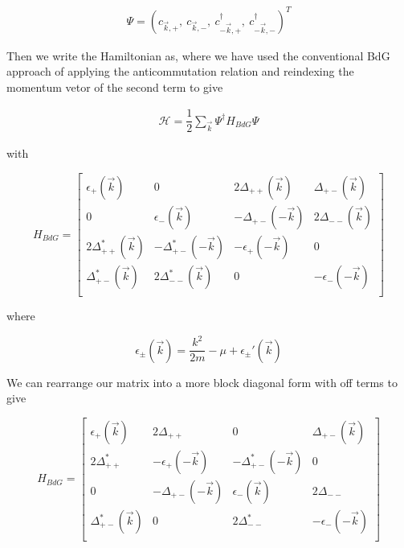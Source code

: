 \begin{align}
  \Psi = (c_{\vec{k},+},\ c_{\vec{k},-},\ c_{-\vec{k},+}^{\dagger},\ c_{-\vec{k},-}^{\dagger} )^T
\end{align}

Then we write the Hamiltonian as, where we have used the conventional BdG approach of applying the anticommutation relation and reindexing the momentum vetor of the second term to give

\begin{align}
  \mathcal{H} = \dfrac{1}{2}\sum\limits_{\vec{k}} \Psi^{\dagger}H_{BdG}\Psi
\end{align}

with 

\begin{equation}
  H_{BdG} = 
  \begin{bmatrix}
    \epsilon_+(\vec{k}) & 0 & 2\Delta_{++}(\vec{k}) & \Delta_{+-}(\vec{k}) \\
    0 & \epsilon_-(\vec{k}) & -\Delta_{+-}(-\vec{k}) & 2\Delta_{--}(\vec{k}) \\
    2\Delta_{++}^*(\vec{k}) & -\Delta_{+-}^*(-\vec{k}) & -\epsilon_+(-\vec{k}) & 0 \\
    \Delta_{+-}^*(\vec{k}) & 2\Delta_{--}^*(\vec{k}) & 0 & -\epsilon_-(-\vec{k}) \\
  \end{bmatrix}
\end{equation}

where 

\begin{equation}
  \epsilon_{\pm}(\vec{k}) = \dfrac{k^2}{2m} - \mu + \epsilon_{\pm}'(\vec{k})
\end{equation}

We can rearrange our matrix into a more block diagonal form with off terms to give

\begin{equation}
  H_{BdG} = 
  \begin{bmatrix}
    \epsilon_+(\vec{k}) & 2\Delta_{++} & 0 & \Delta_{+-}(\vec{k}) \\
    2\Delta_{++}^* & -\epsilon_+(-\vec{k}) & -\Delta_{+-}^*(-\vec{k}) & 0 \\
    0 & -\Delta_{+-}(-\vec{k}) & \epsilon_-(\vec{k}) & 2\Delta_{--} \\
    \Delta_{+-}^*(\vec{k}) & 0 & 2\Delta_{--}^* & -\epsilon_-(-\vec{k}) \\
  \end{bmatrix}
\end{equation}


